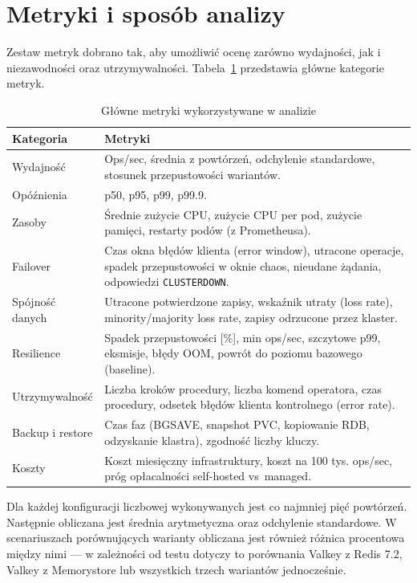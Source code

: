 \section{Metryki i sposób analizy}

Zestaw metryk dobrano tak, aby umożliwić ocenę zarówno wydajności, jak i niezawodności oraz utrzymywalności. Tabela~\ref{tab:metryki_badawcze} przedstawia główne kategorie metryk.

\begin{table}[H]
\centering
\caption{Główne metryki wykorzystywane w analizie}
\label{tab:metryki_badawcze}
\begin{tabularx}{\textwidth}{p{3.8cm}X}
\toprule
\textbf{Kategoria} & \textbf{Metryki} \\
\midrule
Wydajność & Ops/sec, średnia z powtórzeń, odchylenie standardowe, stosunek przepustowości wariantów. \\
Opóźnienia & p50, p95, p99, p99.9. \\
Zasoby & Średnie zużycie CPU, zużycie CPU per pod, zużycie pamięci, restarty podów (z Prometheusa). \\
Failover & Czas okna błędów klienta (error window), utracone operacje, spadek przepustowości w oknie chaos, nieudane żądania, odpowiedzi \texttt{CLUSTERDOWN}. \\
Spójność danych & Utracone potwierdzone zapisy, wskaźnik utraty (loss rate), minority/majority loss rate, zapisy odrzucone przez klaster. \\
Resilience & Spadek przepustowości [\%], min ops/sec, szczytowe p99, eksmisje, błędy OOM, powrót do poziomu bazowego (baseline). \\
Utrzymywalność & Liczba kroków procedury, liczba komend operatora, czas procedury, odsetek błędów klienta kontrolnego (error rate). \\
Backup i restore & Czas faz (BGSAVE, snapshot PVC, kopiowanie RDB, odzyskanie klastra), zgodność liczby kluczy. \\
Koszty & Koszt miesięczny infrastruktury, koszt na 100 tys. ops/sec, próg opłacalności self-hosted vs~managed. \\
\bottomrule
\end{tabularx}
\end{table}

Dla każdej konfiguracji liczbowej wykonywanych jest co najmniej pięć powtórzeń. Następnie obliczana jest średnia arytmetyczna oraz odchylenie standardowe. W scenariuszach porównujących warianty obliczana jest również różnica procentowa między nimi --- w zależności od testu dotyczy to porównania Valkey z Redis 7.2, Valkey z Memorystore lub wszystkich trzech wariantów jednocześnie.

